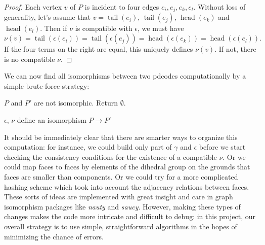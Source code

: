 \documentclass[amsmath,secnumarabic,floatfix,amssymb,nofootinbib,nobibnotes,letterpaper,11pt,tightenlines,showkeys]{revtex4}
\theoremstyle{definition}
\newcommand{\nauty}{\textit{nauty} }
\newcommand{\head}{\operatorname{head}}
\newcommand{\tail}{\operatorname{tail}}
\begin{document}
\begin{proof}
Each vertex $v$ of $P$ is incident to four edges $e_i, e_j, e_k, e_l$. Without loss of generality, let's assume that $v = \tail(e_i)$, $\tail(e_j)$, $\head(e_k)$ and $\head(e_l)$. Then if $\nu$ is compatible with $\epsilon$, we must have
\begin{equation*}
\nu(v) = \tail(\epsilon(e_i)) = \tail(\epsilon(e_j)) = \head(\epsilon(e_k)) = \head(\epsilon(e_l)).
\end{equation*}
If the four terms on the right are equal, this uniquely defines $\nu(v)$. If not, there is no compatible $\nu$.
\end{proof}

We can now find all isomorphisms between two pdcodes computationally by a simple brute-force strategy:

\begin{algorithm}
\begin{algorithmic}[1]

	\State $P$ and $P'$ are not isomorphic. Return $\emptyset$.
\EndIf

			\State $\epsilon$, $\nu$ define an isomorphism $P \rightarrow P'$
		\EndIf
		\EndIf
	\EndFor
\EndFor
\EndProcedure
\end{algorithmic}
\end{algorithm}

It should be immediately clear that there are smarter ways to organize this computation: for instance, we could build only part of $\gamma$ and $\epsilon$ before we start checking the consistency conditions for the existence of a compatible $\nu$. Or we could map faces to faces by elements of the dihedral group on the grounds that faces are smaller than components. Or we could try for a more complicated hashing scheme which took into account the adjacency relations between faces. These sorts of ideas are implemented with great insight and care in graph isomorphism packages like \nauty and \emph{saucy}. However, making these types of changes makes the code more intricate and difficult to debug: in this project, our overall strategy is to use simple, straightforward algorithms in the hopes of minimizing the chance of errors.
\end{document}
